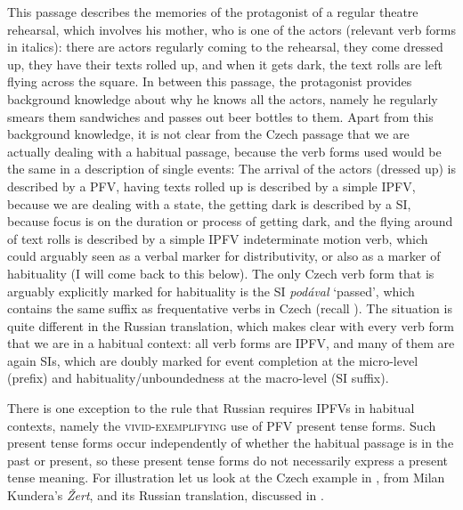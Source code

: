\documentclass[output=paper,colorlinks,citecolor=brown]{langscibook}
\begin{document}
\noindent This passage describes the memories of the protagonist of a regular theatre rehearsal, which involves his mother, who is one of the actors (relevant verb forms in italics): there are actors regularly coming to the rehearsal, they come dressed up, they have their texts rolled up, and when it gets dark, the text rolls are left flying across the square. In between this passage, the protagonist provides background knowledge about why he knows all the actors, namely he regularly smears them sandwiches and passes out beer bottles to them. Apart from this background knowledge, it is not clear from the Czech passage that we are actually dealing with a habitual passage, because the verb forms used would be the same in a description of single events: The arrival of the actors (dressed up) is described by a PFV, having texts rolled up is described by a simple IPFV, because we are dealing with a state, the getting dark is described by a SI, because focus is on the duration or process of getting dark, and the flying around of text rolls is described by a simple IPFV indeterminate motion verb, which could arguably seen as a verbal marker for distributivity, or also as a marker of habituality (I will come back to this below). The only Czech verb form that is arguably explicitly marked for habituality is the SI \textit{podával} `passed', which contains the same suffix as frequentative verbs in Czech (recall ). The situation is quite different in the Russian translation, which makes clear with every verb form that we are in a habitual context: all verb forms are IPFV, and many of them are again SIs, which are doubly marked for event completion at the micro-level (prefix) and habituality/unboundedness at the macro-level (SI suffix).
\fi

There is one exception to the rule that Russian requires IPFVs in habitual contexts, namely the \textsc{vivid-exemplifying} use of PFV present tense forms. Such present tense forms occur independently of whether the habitual passage is in the past or present, so these present tense forms do not necessarily express a present tense meaning. For illustration let us look at %
the Czech example in , from Milan Kundera's \textit{Žert}, and its Russian translation, discussed in \citet[][29]{gehrke22}%
. 
\end{document}
